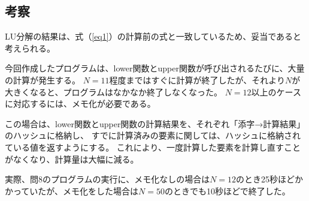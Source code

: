 \documentclass[11pt]{ltjsarticle}
\begin{document}
		\subsection{考察}
			LU分解の結果は、式（\ref{eq1}）の計算前の式と一致しているため、妥当であると考えられる。
			
			今回作成したプログラムは、lower関数とupper関数が呼び出されるたびに、大量の計算が発生する。
			$N=11$程度まではすぐに計算が終了したが、それより$N$が大きくなると、プログラムはなかなか終了しなくなった。
			$N=12$以上のケースに対応するには、メモ化が必要である。
			
			この場合は、lower関数とupper関数の計算結果を、それぞれ「添字→計算結果」のハッシュに格納し、
			すでに計算済みの要素に関しては、ハッシュに格納されている値を返すようにする。
			これにより、一度計算した要素を計算し直すことがなくなり、計算量は大幅に減る。
			
			実際、問8のプログラムの実行に、メモ化なしの場合は$N=12$のとき25秒ほどかかっていたが、メモ化をした場合は$N=50$のときでも10秒ほどで終了した。
\end{document}
